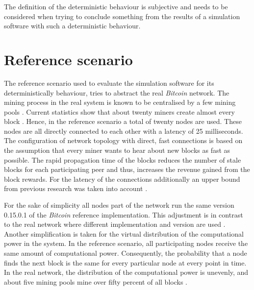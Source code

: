 The definition of the deterministic behaviour is subjective and needs to be considered when trying to conclude something from the results of a simulation software with such a deterministic behaviour.

\section{Reference scenario}

The reference scenario used to evaluate the simulation software for its deterministically behaviour, tries to abstract the real \textit{Bitcoin} network.
The mining process in the real system is known to be centralised by a few mining pools \cite{gervais2014bitcoin, beikverdi2015trend, tschorsch2016bitcoin, clarkresearch}.
Current statistics show that about twenty miners create almost every block \cite{blockchaininfopools, coindanceblocks, bitcointickerpools}.
Hence, in the reference scenario a total of twenty nodes are used.
These nodes are all directly connected to each other with a latency of 25 milliseconds.
The configuration of network topology with direct, fast connections is based on the assumption that every miner wants to hear about new blocks as fast as possible.
The rapid propagation time of the blocks reduces the number of stale blocks for each participating peer and thus, increases the revenue gained from the block rewards.
For the latency of the connections additionally an upper bound from previous research was taken into account \cite{decker2013information}.

For the sake of simplicity all nodes part of the network run the same version 0.15.0.1 \cite{bitcoin15} of the \textit{Bitcoin} reference implementation.
This adjustment is in contrast to the real network where different implementation and version are used \cite{coindancenodes}.
Another simplification is taken for the virtual distribution of the computational power in the system.
In the reference scenario, all participating nodes  receive the same amount of computational power.
Consequently, the probability that a node finds the next block is the same for every particular node at every point in time.
In the real network, the distribution of the computational power is unevenly, and about five mining pools mine over fifty percent of all blocks \cite{gervais2014bitcoin, blockchaininfopools, coindanceblocks, bitcointickerpools}. 

